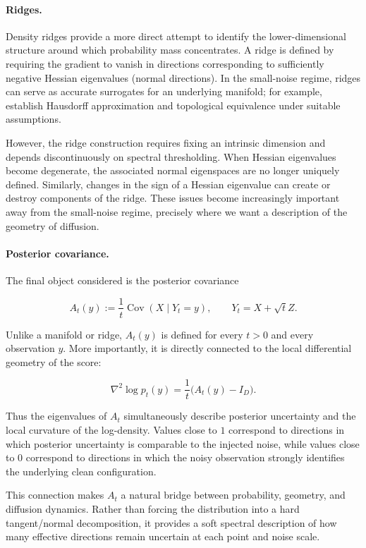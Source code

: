 \documentclass{article}
\DeclareMathOperator{\Cov}{Cov}
\theoremstyle{plain}
\theoremstyle{definition}
\theoremstyle{remark}
\begin{document}
\paragraph{Ridges.}
Density ridges provide a more direct attempt to identify the lower-dimensional structure around which probability mass concentrates. A ridge is defined by requiring the gradient to vanish in directions corresponding to sufficiently negative Hessian eigenvalues (normal directions). In the small-noise regime, ridges can serve as accurate surrogates for an underlying manifold; for example, \citet{genovese2014nonparametric} establish Hausdorff approximation and topological equivalence under suitable assumptions.

However, the ridge construction requires fixing an intrinsic dimension and depends discontinuously on spectral thresholding. When Hessian eigenvalues become degenerate, the associated normal eigenspaces are no longer uniquely defined. Similarly, changes in the sign of a Hessian eigenvalue can create or destroy components of the ridge. These issues become increasingly important away from the small-noise regime, precisely where we want a description of the geometry of diffusion.

\paragraph{Posterior covariance.}
The final object considered is the posterior covariance

$$
    A_t(y)
    :=
    \frac{1}{t}\Cov(X\mid Y_t=y),
    \qquad
    Y_t=X+\sqrt{t}Z.
$$

Unlike a manifold or ridge, $A_t(y)$ is defined for every $t>0$ and every observation $y$. More importantly, it is directly connected to the local differential geometry of the score:

$$
    \nabla^2 \log p_t(y)
    =
    \frac{1}{t}\bigl(A_t(y)-I_D\bigr).
$$

Thus the eigenvalues of $A_t$ simultaneously describe posterior uncertainty and the local curvature of the log-density. Values close to $1$ correspond to directions in which posterior uncertainty is comparable to the injected noise, while values close to $0$ correspond to directions in which the noisy observation strongly identifies the underlying clean configuration.

This connection makes $A_t$ a natural bridge between probability, geometry, and diffusion dynamics. Rather than forcing the distribution into a hard tangent/normal decomposition, it provides a soft spectral description of how many effective directions remain uncertain at each point and noise scale.
\end{document}
